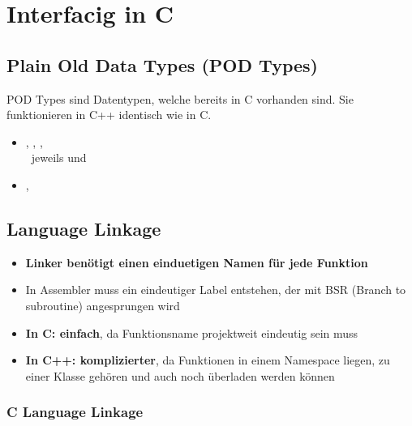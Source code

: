 \section{Interfacig in C}

\subsection{Plain Old Data Types (POD Types)}



\begin{minipage}[t]{0.58\columnwidth}
    \raggedright  
    POD Types sind Datentypen, welche bereits in C vorhanden sind. Sie funktionieren in C++ identisch wie in C.
\end{minipage}
\hfill
\begin{minipage}[t]{0.4\columnwidth}
    \raggedright  

    \begin{itemize}
        \item {}, , ,  \\
            \textrightarrow\ jeweils  und 
        \item {}, 
    \end{itemize}
\end{minipage}


\subsection{Language Linkage}

\begin{itemize}
    \item \textbf{Linker benötigt einen einduetigen Namen für jede Funktion}
    \item In Assembler muss ein eindeutiger Label entstehen, der mit BSR (Branch to subroutine) angesprungen wird
    \item \textbf{In C: einfach}, da Funktionsname projektweit eindeutig sein muss
    \item \textbf{In C++: komplizierter}, da Funktionen in einem Namespace liegen, zu einer Klasse gehören und auch noch überladen werden können
\end{itemize}


\subsubsection{C Language Linkage}

